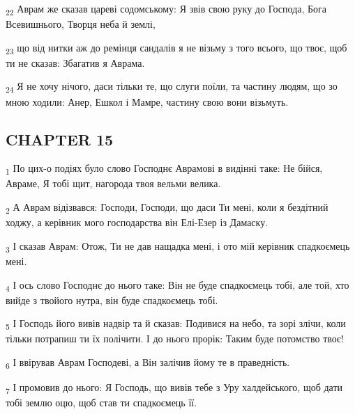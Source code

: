 \begin{tcolorbox}
\textsubscript{22} Аврам же сказав цареві содомському: Я звів свою руку до Господа, Бога Всевишнього, Творця неба й землі,
\end{tcolorbox}
\begin{tcolorbox}
\textsubscript{23} що від нитки аж до ремінця сандалів я не візьму з того всього, що твоє, щоб ти не сказав: Збагатив я Аврама.
\end{tcolorbox}
\begin{tcolorbox}
\textsubscript{24} Я не хочу нічого, даси тільки те, що слуги поїли, та частину людям, що зо мною ходили: Анер, Ешкол і Мамре, частину свою вони візьмуть.
\end{tcolorbox}
\subsection{CHAPTER 15}
\begin{tcolorbox}
\textsubscript{1} По цих-о подіях було слово Господнє Аврамові в видінні таке: Не бійся, Авраме, Я тобі щит, нагорода твоя вельми велика.
\end{tcolorbox}
\begin{tcolorbox}
\textsubscript{2} А Аврам відізвався: Господи, Господи, що даси Ти мені, коли я бездітний ходжу, а керівник мого господарства він Елі-Езер із Дамаску.
\end{tcolorbox}
\begin{tcolorbox}
\textsubscript{3} І сказав Аврам: Отож, Ти не дав нащадка мені, і ото мій керівник спадкоємець мені.
\end{tcolorbox}
\begin{tcolorbox}
\textsubscript{4} І ось слово Господнє до нього таке: Він не буде спадкоємець тобі, але той, хто вийде з твойого нутра, він буде спадкоємець тобі.
\end{tcolorbox}
\begin{tcolorbox}
\textsubscript{5} І Господь його вивів надвір та й сказав: Подивися на небо, та зорі злічи, коли тільки потрапиш ти їх полічити. І до нього прорік: Таким буде потомство твоє!
\end{tcolorbox}
\begin{tcolorbox}
\textsubscript{6} І ввірував Аврам Господеві, а Він залічив йому те в праведність.
\end{tcolorbox}
\begin{tcolorbox}
\textsubscript{7} І промовив до нього: Я Господь, що вивів тебе з Уру халдейського, щоб дати тобі землю оцю, щоб став ти спадкоємець її.
\end{tcolorbox}
